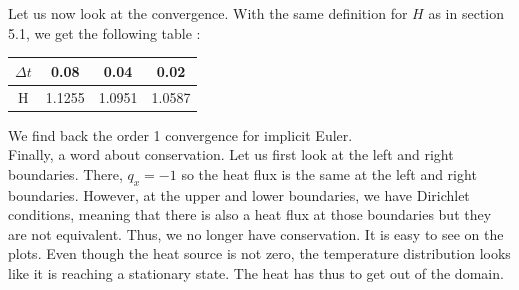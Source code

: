 Let us now look at the convergence. With the same definition for $H$ as in section 5.1, we get the following table :
\begin{center}
\begin{tabular}{|c|c|c|c|}
\hline 
$\Delta t$ & 0.08 & 0.04 & 0.02 \\ 
\hline 
H & 1.1255 & 1.0951 & 1.0587 \\ 
\hline 
\end{tabular} 
\end{center}

We find back the order 1 convergence for implicit Euler.\\

Finally, a word about conservation. Let us first look at the left and right boundaries. There,  $q_x=-1$ so the heat flux is the same at the left and right boundaries. However, at the upper and lower boundaries, we have Dirichlet conditions, meaning that there is also a heat flux at those boundaries but they are not equivalent. Thus, we no longer have conservation. It is easy to see on the plots. Even though the heat source is not zero, the temperature distribution looks like it is reaching a stationary state. The heat has thus to get out of the domain.